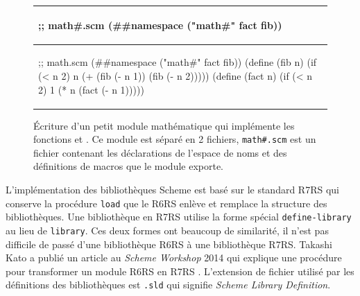 \begin{center}
  \begin{figure}[h]
  \begin{tabular}{|l|}
\hline
\begin{mplisting}{0.5}
;; math#.scm
(##namespace ("math#" fact fib))
\end{mplisting} \\\hline
\begin{mplisting}{0.6}
;; math.scm
(##namespace ("math#" fact fib))
(define (fib n)
  (if (< n 2)
    n
    (+ (fib (- n 1)) (fib (- n 2)))))
(define (fact n)
  (if (< n 2)
    1
    (* n (fact (- n 1)))))
\end{mplisting}\\\hline
  \end{tabular}
  \caption{Écriture d'un petit module mathématique qui implémente les fonctions 
    et . Ce module est séparé en 2 fichiers, \texttt{math\#.scm} est un fichier
    contenant les déclarations de l'espace de noms et des définitions de macros que le module
    exporte.}
  \label{fig:math_module1}
\end{figure}
\end{center}


%

L'implémentation des bibliothèques Scheme est basé sur le standard R7RS qui
conserve la procédure \texttt{load} que le R6RS enlève et remplace la structure
des bibliothèques.  Une bibliothèque en R7RS utilise la forme spécial
\texttt{define-library} au lieu de \texttt{library}. Ces deux formes ont
beaucoup de similarité, il n'est pas difficile de passé d'une bibliothèque R6RS
à une bibliothèque R7RS. Takashi Kato a publié un article au \emph{Scheme
Workshop} 2014 qui explique une procédure pour transformer un module R6RS en
R7RS \cite{SW2014:R6RS/to/R7RS}.  L'extension de fichier utilisé par les
définitions des bibliothèques est \verb|.sld| qui signifie \emph{Scheme Library
Definition}.

